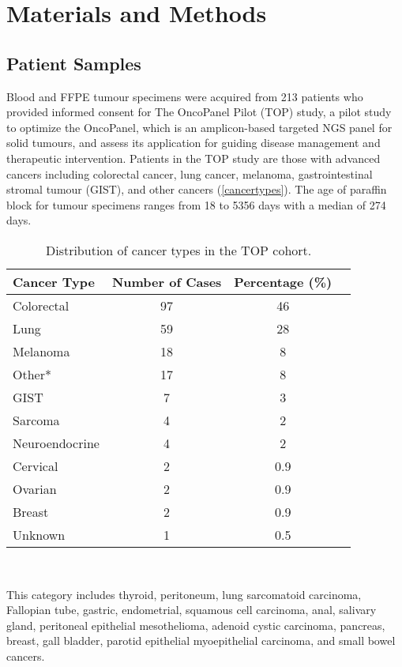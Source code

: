
\chapter{Materials and Methods}
\label{ch:Materialsandmethods}

\section{Patient Samples}
\label{sec:PatientSamples}

Blood and FFPE tumour specimens were acquired from 213 patients who provided informed consent for The OncoPanel Pilot (TOP) study, a pilot study to optimize the OncoPanel, which is an amplicon-based targeted NGS panel for solid tumours, and assess its application for guiding disease management and therapeutic intervention. Patients in the TOP study are those with advanced cancers including colorectal cancer, lung cancer, melanoma, gastrointestinal stromal tumour (GIST), and other cancers (\autoref{cancertypes}). The age of paraffin block for tumour specimens ranges from 18 to 5356 days with a median of 274 days.

\begin{table}[H]
\caption{Distribution of cancer types in the TOP cohort.}
\label{cancertypes}
\centering
      \begin{tabular}{lccc}
        \hline
        Cancer Type & Number of Cases & Percentage (\%) \\ \hline
        Colorectal & 97 & 46 \\
        Lung & 59 & 28 \\
        Melanoma & 18 & 8 \\
				Other* & 17 & 8 \\
				GIST & 7 & 3 \\
				Sarcoma & 4 & 2 \\
				Neuroendocrine & 4 & 2 \\
				Cervical & 2 & 0.9 \\
				Ovarian & 2 & 0.9 \\
				Breast & 2 & 0.9 \\
				Unknown & 1 & 0.5 \\ \hline
      \end{tabular} \\
			\vspace{0.5cm}
\raggedright
{\small *This category includes thyroid, peritoneum, lung sarcomatoid carcinoma, Fallopian tube, gastric, endometrial, squamous cell carcinoma, anal, salivary gland, peritoneal epithelial mesothelioma, adenoid cystic carcinoma, pancreas, breast, gall bladder, parotid epithelial myoepithelial carcinoma, and small bowel cancers.}
\end{table}

